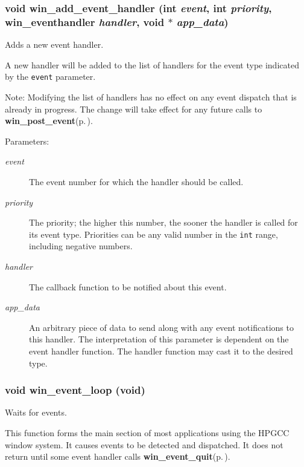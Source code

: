 \subsubsection{\setlength{\rightskip}{0pt plus 5cm}void win\_\-add\_\-event\_\-handler (int {\em event}, int {\em priority}, {\bf win\_\-eventhandler} {\em handler}, void $\ast$ {\em app\_\-data})}\label{winevent_8h_a5}


Adds a new event handler. 

A new handler will be added to the list of handlers for the event type indicated by the {\tt event} parameter.

\begin{Desc}
\item[Note:]Modifying the list of handlers has no effect on any event dispatch that is already in progress. The change will take effect for any future calls to {\bf win\_\-post\_\-event}{\rm (p.\,\pageref{winevent_8h_a4})}.\end{Desc}
\begin{Desc}
\item[Parameters:]
\begin{description}
\item[{\em event}]The event number for which the handler should be called. \item[{\em priority}]The priority; the higher this number, the sooner the handler is called for its event type. Priorities can be any valid number in the {\tt int} range, including negative numbers. \item[{\em handler}]The callback function to be notified about this event.\item[{\em app\_\-data}]An arbitrary piece of data to send along with any event notifications to this handler. The interpretation of this parameter is dependent on the event handler function. The handler function may cast it to the desired type. \end{description}
\end{Desc}
\subsubsection{\setlength{\rightskip}{0pt plus 5cm}void win\_\-event\_\-loop (void)}\label{winevent_8h_a7}


Waits for events. 

This function forms the main section of most applications using the HPGCC window system. It causes events to be detected and dispatched. It does not return until some event handler calls {\bf win\_\-event\_\-quit}{\rm (p.\,\pageref{winevent_8h_a8})}. 

